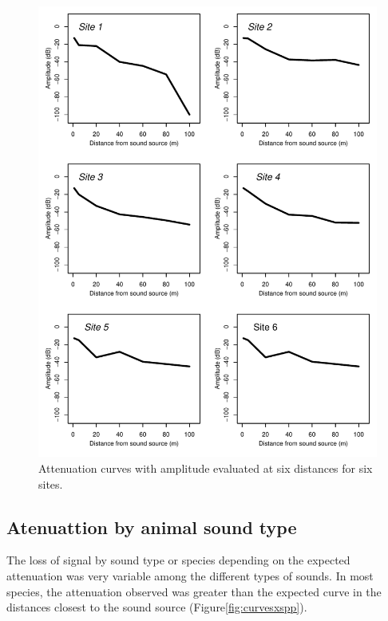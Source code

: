\documentclass[fleqn,10pt,lineno]{wlpeerj} %
\begin{document}
\begin{figure}

{\centering \includegraphics[width=1\linewidth]{ASR_MyPaper_2020_files/figure-latex/curvesxsite-1} 

}

\caption{Attenuation curves with amplitude evaluated at six distances for six sites.\label{fig:curvesxsite}}\label{fig:curvesxsite}
\end{figure}

\hypertarget{atenuattion-by-animal-sound-type}{%
\subsection*{Atenuattion by animal sound type}\label{atenuattion-by-animal-sound-type}}

The loss of signal by sound type or species depending on the expected attenuation was very variable among the different types of sounds. In most species, the attenuation observed was greater than the expected curve in the distances closest to the sound source (Figure\ref{fig:curvesxspp}).
\end{document}

